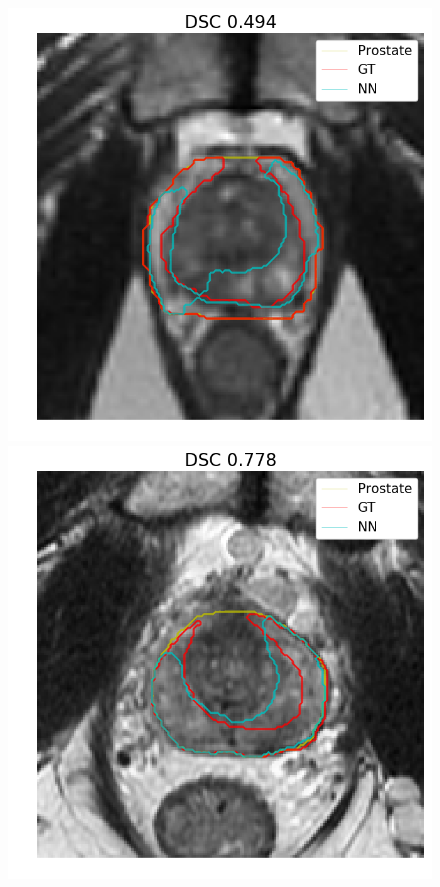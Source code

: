 \begin{figure}[h]
    \includegraphics[totalheight=.2\textheight]{imgs/results/PZ_GE__GE_yes_ROI_MIN_Case-0481.png}
    \includegraphics[totalheight=.2\textheight]{imgs/results/PZ_GE__GE_yes_ROI_MEAN_Case-0462.png}

\end{figure}
